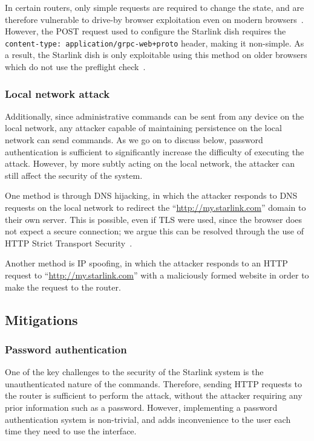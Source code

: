 In certain routers, only simple requests are required to change the state, and are therefore vulnerable to drive-by browser exploitation even on modern browsers~\cite{csrf_internal_network}.
However, the POST request used to configure the Starlink dish requires the \texttt{content-type: application/grpc-web+proto} header, making it non-simple.
As a result, the Starlink dish is only exploitable using this method on older browsers which do not use the preflight check~\cite{cors_w3c}.

\subsubsection{Local network attack}

Additionally, since administrative commands can be sent from any device on the local network, any attacker capable of maintaining persistence on the local network can send commands.
As we go on to discuss below, password authentication is sufficient to significantly increase the difficulty of executing the attack.
However, by more subtly acting on the local network, the attacker can still affect the security of the system.

One method is through DNS hijacking, in which the attacker responds to DNS requests on the local network to redirect the ``\url{http://my.starlink.com}'' domain to their own server.
This is possible, even if TLS were used, since the browser does not expect a secure connection; we argue this can be resolved through the use of HTTP Strict Transport Security~\cite{rfc6797}.

Another method is IP spoofing, in which the attacker responds to an HTTP request to ``\url{http://my.starlink.com}'' with a maliciously formed website in order to make the request to the router.

\subsection{Mitigations}

\subsubsection{Password authentication}\label{sec:password_authentication}

One of the key challenges to the security of the Starlink system is the unauthenticated nature of the commands.
Therefore, sending HTTP requests to the router is sufficient to perform the attack, without the attacker requiring any prior information such as a password.
However, implementing a password authentication system is non-trivial, and adds inconvenience to the user each time they need to use the interface.

